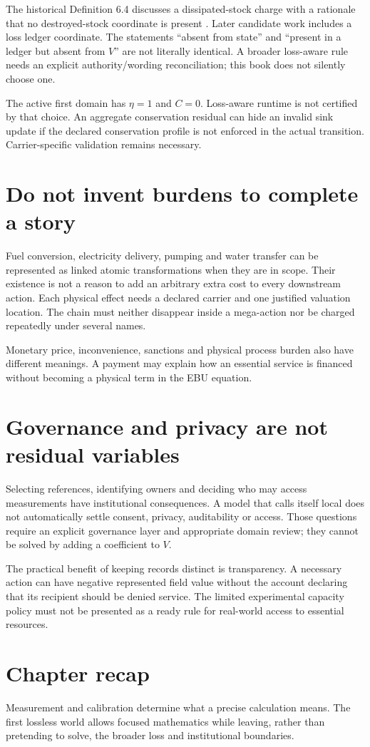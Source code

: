 The historical Definition 6.4 discusses a dissipated-stock charge with a
rationale that no destroyed-stock coordinate is present \cite{foundation}.
Later candidate work includes a loss ledger coordinate. The statements
``absent from state'' and ``present in a ledger but absent from $V$'' are
not literally identical. A broader loss-aware rule needs an explicit
authority/wording reconciliation; this book does not silently choose one.

The active first domain has $\eta=1$ and $C=0$. Loss-aware runtime is
not certified by that choice. An aggregate conservation residual can hide
an invalid sink update if the declared conservation profile is not enforced
in the actual transition. Carrier-specific validation remains necessary.

\section{Do not invent burdens to complete a story}
Fuel conversion, electricity delivery, pumping and water transfer can be
represented as linked atomic transformations when they are in scope. Their
existence is not a reason to add an arbitrary extra cost to every downstream
action. Each physical effect needs a declared carrier and one justified
valuation location. The chain must neither disappear inside a mega-action
nor be charged repeatedly under several names.

Monetary price, inconvenience, sanctions and physical process burden also
have different meanings. A payment may explain how an essential service
is financed without becoming a physical term in the EBU equation.

\section{Governance and privacy are not residual variables}
Selecting references, identifying owners and deciding who may access
measurements have institutional consequences. A model that calls itself
local does not automatically settle consent, privacy, auditability or access.
Those questions require an explicit governance layer and appropriate domain
review; they cannot be solved by adding a coefficient to $V$.

The practical benefit of keeping records distinct is transparency. A
necessary action can have negative represented field value without the
account declaring that its recipient should be denied service. The limited
experimental capacity policy must not be presented as a ready rule for
real-world access to essential resources.

\section*{Chapter recap}
Measurement and calibration determine what a precise calculation means.
The first lossless world allows focused mathematics while leaving, rather
than pretending to solve, the broader loss and institutional boundaries.
